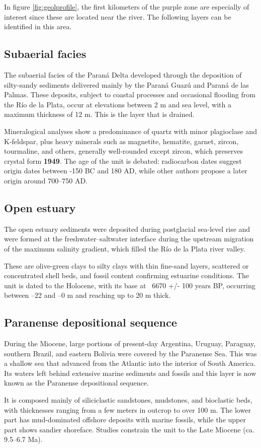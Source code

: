 In figure \ref{fig:geolprofile}, the first kilometers of the purple zone are especially of interest since these are located near the river. The following layers can be identified in this area.

\subsection{Subaerial facies}
The subaerial facies of the Paraná Delta developed through the deposition of silty-sandy sediments delivered mainly by the Paraná Guazú and Paraná de las Palmas. These deposits, subject to coastal processes and occasional flooding from the Río de la Plata, occur at elevations between 2 m and sea level, with a maximum thickness of 12 m. This is the layer that is drained.

Mineralogical analyses show a predominance of quartz with minor plagioclase and K-feldspar, plus heavy minerals such as magnetite, hematite, garnet, zircon, tourmaline, and others, generally well-rounded except zircon, which preserves crystal form \textbf{1949}. The age of the unit is debated: radiocarbon dates suggest origin dates between -150 BC and 180 AD, while other authors propose a later origin around 700–750 AD.

\subsection{Open estuary}
The open estuary sediments were deposited during postglacial sea-level rise and were formed at the freshwater–saltwater interface during the upstream migration of the maximum salinity gradient, which filled the Río de la Plata river valley.

These are olive-green clays to silty clays with thin fine-sand layers, scattered or concentrated shell beds, and fossil content confirming estuarine conditions. The unit is dated to the Holocene, with its base at ~6670 +/- 100 years BP, occurring between –22 and –0 m and reaching up to 20 m thick.

\subsection{Paranense depositional sequence}
During the Miocene, large portions of present-day Argentina, Uruguay, Paraguay, southern Brazil, and eastern Bolivia were covered by the Paranense Sea. This was a shallow sea that advanced from the Atlantic into the interior of South America. Its waters left behind extensive marine sediments and fossils and this layer is now known as the Paranense depositional sequence.

It is composed mainly of siliciclastic sandstones, mudstones, and bioclastic beds, with thicknesses ranging from a few meters in outcrop to over 100 m. The lower part has mud-dominated offshore deposits with marine fossils, while the upper part shows sandier shoreface. Studies constrain the unit to the Late Miocene (ca. 9.5–6.7 Ma).
